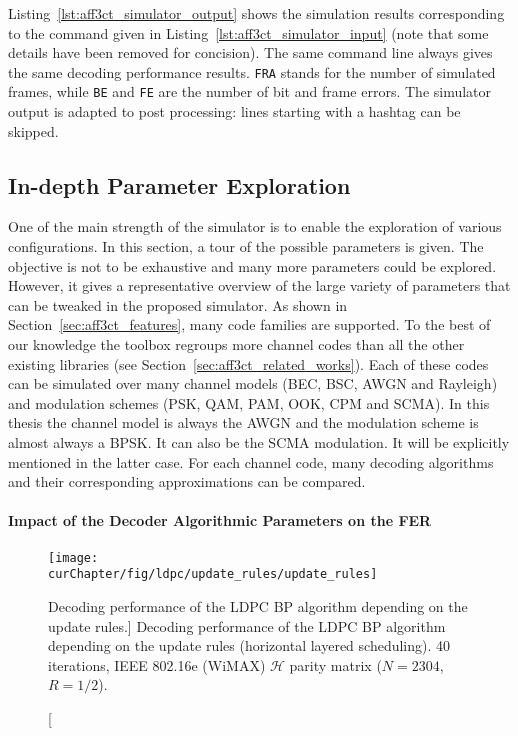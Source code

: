 \begin{listing}[htp]
  \inputminted[frame=lines,linenos]{console}{\curChapter/src/use_cases/simulator/output.txt}
  \caption{Example of an \AFFECT simulator output.}
  \label{lst:aff3ct_simulator_output}
\end{listing}

Listing~\ref{lst:aff3ct_simulator_output} shows the simulation results
corresponding to the \AFFECT command given in
Listing~\ref{lst:aff3ct_simulator_input} (note that some details have been
removed for concision). The same command line always gives the same decoding
performance results. \verb|FRA| stands for the number of simulated frames,
while \verb|BE| and \verb|FE| are the number of bit and frame errors. The
simulator output is adapted to post processing: lines starting with a hashtag
can be skipped.

\subsection{In-depth Parameter Exploration}

One of the main strength of the \AFFECT simulator is to enable the exploration
of various configurations. In this section, a tour of the possible parameters is
given. The objective is not to be exhaustive and many more parameters could be
explored. However, it gives a representative overview of the large variety of
parameters that can be tweaked in the proposed simulator. As shown in
Section~\ref{sec:aff3ct_features}, many code families are supported. To the best
of our knowledge the \AFFECT toolbox regroups more channel codes than all the
other existing libraries (see Section~\ref{sec:aff3ct_related_works}). Each of
these codes can be simulated over many channel models (BEC, BSC, AWGN and
Rayleigh) and modulation schemes (PSK, QAM, PAM, OOK, CPM and SCMA). In this
thesis the channel model is always the AWGN and the modulation scheme is almost
always a BPSK. It can also be the SCMA modulation. It will be explicitly
mentioned in the latter case. For each channel code, many decoding algorithms
and their corresponding approximations can be compared.

\paragraph{Impact of the Decoder Algorithmic Parameters on the FER}

\begin{figure}[htp]
  \centering
  \texttt{[image: \\curChapter/fig/ldpc/update\_rules/update\_rules]}
  \caption
    [Decoding performance of the LDPC BP algorithm depending on the update
     rules.]
    {Decoding performance of the LDPC BP algorithm depending on the update rules
     (horizontal layered scheduling). 40 iterations, IEEE 802.16e (WiMAX)
     $\mathcal{H}$ parity matrix ($N=2304$, $R=1/2$).}
  \label{plot:aff3ct_ldpc_update_rules}
\end{figure}

